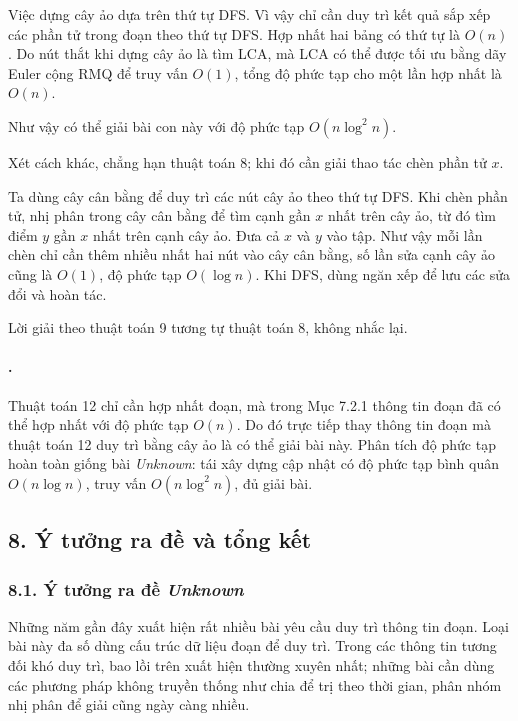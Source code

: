 \documentclass[11pt]{article}
\begin{document}
Việc dựng cây ảo dựa trên thứ tự DFS. Vì vậy chỉ cần duy trì kết quả sắp xếp
các phần tử trong đoạn theo thứ tự DFS. Hợp nhất hai bảng có thứ tự là
\(O(n)\). Do nút thắt khi dựng cây ảo là tìm LCA, mà LCA có thể được tối ưu
bằng dãy Euler cộng RMQ để truy vấn \(O(1)\), tổng độ phức tạp cho một lần
hợp nhất là \(O(n)\).

Như vậy có thể giải bài con này với độ phức tạp \(O(n\log^2 n)\).

Xét cách khác, chẳng hạn thuật toán 8; khi đó cần giải thao tác chèn phần tử
\(x\).

Ta dùng cây cân bằng để duy trì các nút cây ảo theo thứ tự DFS. Khi chèn phần
tử, nhị phân trong cây cân bằng để tìm cạnh gần \(x\) nhất trên cây ảo, từ đó
tìm điểm \(y\) gần \(x\) nhất trên cạnh cây ảo. Đưa cả \(x\) và \(y\) vào tập.
Như vậy mỗi lần chèn chỉ cần thêm nhiều nhất hai nút vào cây cân bằng, số lần
sửa cạnh cây ảo cũng là \(O(1)\), độ phức tạp \(O(\log n)\). Khi DFS, dùng
ngăn xếp để lưu các sửa đổi và hoàn tác.

Lời giải theo thuật toán 9 tương tự thuật toán 8, không nhắc lại.

\paragraph{.}
Thuật toán 12 chỉ cần hợp nhất đoạn, mà trong Mục 7.2.1 thông tin đoạn đã có
thể hợp nhất với độ phức tạp \(O(n)\). Do đó trực tiếp thay thông tin đoạn mà
thuật toán 12 duy trì bằng cây ảo là có thể giải bài này. Phân tích độ phức
tạp hoàn toàn giống bài \emph{Unknown}: tái xây dựng cập nhật có độ phức tạp
bình quân \(O(n\log n)\), truy vấn \(O(n\log^2 n)\), đủ giải bài.

\subsection*{8. Ý tưởng ra đề và tổng kết}

\subsubsection*{8.1. Ý tưởng ra đề \emph{Unknown}}

Những năm gần đây xuất hiện rất nhiều bài yêu cầu duy trì thông tin đoạn. Loại
bài này đa số dùng cấu trúc dữ liệu đoạn để duy trì. Trong các thông tin tương
đối khó duy trì, bao lồi trên xuất hiện thường xuyên nhất; những bài cần dùng
các phương pháp không truyền thống như chia để trị theo thời gian, phân nhóm
nhị phân để giải cũng ngày càng nhiều.
\end{document}
